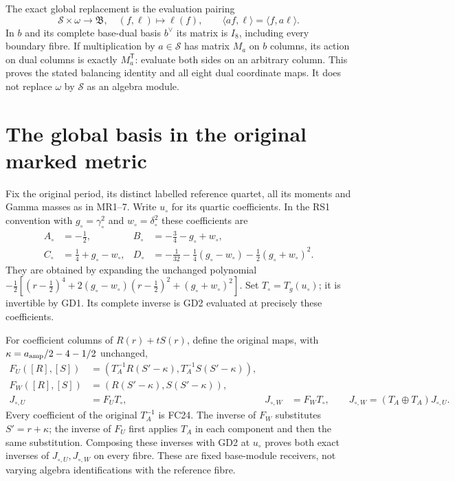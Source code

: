 The exact global replacement is the evaluation pairing
\begin{equation}
 \mathscr S\times\omega\longrightarrow\mathfrak B,
 \quad(f,\ell)\longmapsto\ell(f),\qquad
 \langle af,\ell\rangle=\langle f,a\ell\rangle.
 \tag{GD12}
\end{equation}
In $b$ and its complete base-dual basis $b^\vee$ its
matrix is $I_8$, including every boundary fibre.
If multiplication by $a\in\mathscr S$ has matrix $M_a$
on $b$ columns, its action on dual columns is exactly
$M_a^{\mathsf T}$: evaluate both sides on an arbitrary
column. This proves the stated balancing identity and
all eight dual coordinate maps. It does not replace
$\omega$ by $\mathscr S$ as an algebra module.

\section{The global basis in the original marked metric}
Fix the original period, its distinct labelled reference
quartet, all its moments and Gamma masses as in MR1--7.
Write $u_\circ$ for its quartic coefficients. In the
RS1 convention with $g_\circ=\gamma_\circ^2$ and
$w_\circ=\delta_\circ^2$ these coefficients are
\begin{equation}
 \begin{aligned}
 A_\circ&=-\tfrac12,&B_\circ&=-\tfrac34-g_\circ+w_\circ,\\
 C_\circ&=\tfrac14+g_\circ-w_\circ,&
 D_\circ&=-\tfrac1{32}-\tfrac14(g_\circ-w_\circ)
                         -\tfrac12(g_\circ+w_\circ)^2.
 \end{aligned}\tag{GD13}
\end{equation}
They are obtained by expanding the unchanged polynomial
$-\tfrac12[(r-\tfrac12)^4+2(g_\circ-w_\circ)(r-\tfrac12)^2
 +(g_\circ+w_\circ)^2]$. Set $T_\circ=T_g(u_\circ)$;
it is invertible by GD1. Its complete inverse is GD2
evaluated at precisely these coefficients.

For coefficient columns of $R(r)+tS(r)$, define the
original maps, with $\kappa=a_{\rm amp}/2-4-1/2$ unchanged,
\begin{equation}
\begin{aligned}
 F_U([R],[S])&=(T_A^{-1}R(S'-\kappa),T_A^{-1}S(S'-\kappa)),\\
 F_W([R],[S])&=(R(S'-\kappa),S(S'-\kappa)),\\
 J_{\circ,U}&=F_UT_\circ,&J_{\circ,W}&=F_WT_\circ,
 \qquad J_{\circ,W}=(T_A\oplus T_A)J_{\circ,U}.
\end{aligned}\tag{GD14}
\end{equation}
Every coefficient of the original $T_A^{-1}$ is FC24.
The inverse of $F_W$ substitutes $S'=r+\kappa$;
the inverse of $F_U$ first applies $T_A$ in each
component and then the same substitution. Composing
these inverses with GD2 at $u_\circ$ proves both exact
inverses of $J_{\circ,U},J_{\circ,W}$ on every fibre.
These are fixed base-module receivers, not varying
algebra identifications with the reference fibre.


